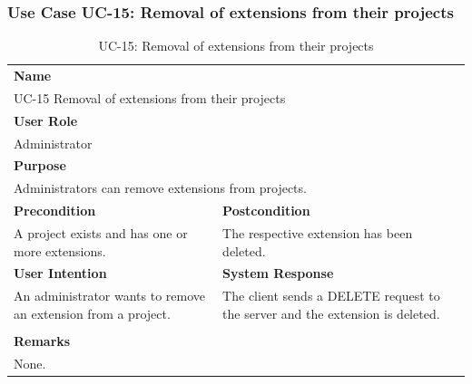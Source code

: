 \subsubsection{Use Case UC-15: Removal of extensions from their projects}\label{subsubsec:use-case-uc-15:-removal-of-extensions-from-their-projects}

\begin{table}[H]
    \centering
    \begin{tabular}{|p{}|p{}|}

        \hline
        \multicolumn{2}{|l|}{\rowcolor{gray!50}\textbf{Name}} \\
        \multicolumn{2}{|l|}{UC-15 Removal of extensions from their projects} \\ \hline

        \multicolumn{2}{|l|}{\rowcolor{gray!50}\textbf{User Role}} \\
        \multicolumn{2}{|l|}{Administrator} \\ \hline

        \multicolumn{2}{|l|}{\rowcolor{gray!50}\textbf{Purpose}} \\
        \multicolumn{2}{|l|}{Administrators can remove extensions from projects.} \\ \hline

        \rowcolor{gray!50}\textbf{Precondition} & \rowcolor{gray!50}\textbf{Postcondition} \\
        A project exists and has one or more extensions.
        &
        The respective extension has been deleted.  \\ \hline

        \rowcolor{gray!50}\textbf{User Intention} & \rowcolor{gray!50}\textbf{System Response} \\
        An administrator wants to remove an extension from a project.
        &
        The client sends a DELETE request to the server and the extension is deleted. \\ \hline

        & \\ \hline

        \multicolumn{2}{|l|}{\rowcolor{gray!50}\textbf{Remarks}} \\
        \multicolumn{2}{|p{1\textwidth}|}{None.} \\ \hline
    \end{tabular}
    \caption{UC-15: Removal of extensions from their projects}
    \label{tab:uc-removal-of-extensions-from-their-projects}
\end{table}

